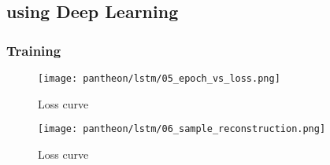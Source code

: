\subsection{using Deep Learning}
\label{072_union_lstm}
\subsubsection{Training}
\begin{figure}[H]
	\centering
	\texttt{[image: pantheon/lstm/05\_epoch\_vs\_loss.png]}
	\caption{Loss curve}
	\label{fig:loss_curve_union}
\end{figure}
\begin{figure}[H]
	\centering
	\texttt{[image: pantheon/lstm/06\_sample\_reconstruction.png]}
	\caption{Loss curve}
	\label{fig:reconstruction_lstm_union}
\end{figure}
